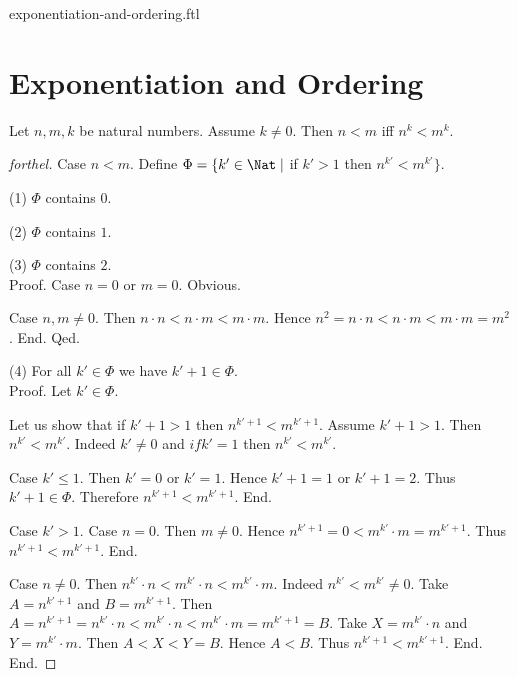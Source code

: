 \documentclass{naproche-library}
\begin{document}
\begin{smodule}{exponentiation-and-ordering.ftl}

  \section*{Exponentiation and Ordering}

  \begin{proposition}[forthel,id=ARITHMETIC_09_3373702288769024,printid]
    Let $n, m, k$ be natural numbers.
    Assume $k \neq 0$.
    Then $n < m$ iff $n^{k} < m^{k}$.
  \end{proposition}
  \begin{proof}[forthel]
    Case $n < m$.
      Define $\Phi = \{ k' \in \Nat \mid$ if $k' > 1$ then $n^{k'} < m^{k'} \}$.

      (1) $\Phi$ contains $0$.

      (2) $\Phi$ contains $1$.

      (3) $\Phi$ contains $2$. \\
      Proof.
        Case $n = 0$ or $m = 0$. Obvious.

        Case $n, m \neq 0$.
          Then $n \cdot n
            < n \cdot m
            < m \cdot m$.
          Hence $n^{2}
            = n \cdot n
            < n \cdot m
            < m \cdot m
            = m^{2}$.
        End.
      Qed.

      (4) For all $k' \in \Phi$ we have $k' + 1 \in \Phi$. \\
      Proof.
        Let $k' \in \Phi$.

        Let us show that if $k' + 1 > 1$ then $n^{k' + 1} < m^{k' + 1}$.
          Assume $k' + 1 > 1$.
          Then $n^{k'} < m^{k'}$.
          Indeed $k' \neq 0$ and $if k' = 1$ then $n^{k'} < m^{k'}$.

          Case $k' \leq 1$.
            Then $k' = 0$ or $k' = 1$.
            Hence $k' + 1 = 1$ or $k' + 1 = 2$.
            Thus $k' + 1 \in \Phi$.
            Therefore $n^{k' + 1} < m^{k' + 1}$.
          End.

          Case $k' > 1$.
            Case $n = 0$.
              Then $m \neq 0$.
              Hence $n^{k' + 1}
                = 0
                < m^{k'} \cdot m
                = m^{k' + 1}$.
              Thus $n^{k' + 1} < m^{k' + 1}$.
            End.

            Case $n \neq 0$.
              Then $n^{k'} \cdot n
                < m^{k'} \cdot n
                < m^{k'} \cdot m$.
              Indeed $n^{k'} < m^{k'} \neq 0$.
              Take $A = n^{k' + 1}$ and $B = m^{k' + 1}$. %
              Then $A
                = n^{k' + 1}
                = n^{k'} \cdot n
                < m^{k'} \cdot n
                < m^{k'} \cdot m
                = m^{k' + 1}
                = B$.
              Take $X = m^{k'} \cdot n$ and $Y = m^{k'} \cdot m$.
              Then $A < X < Y = B$.
              Hence $A < B$.
              Thus $n^{k' + 1} < m^{k' + 1}$.
            End.
          End.


\end{proof}
\end{smodule}
\end{document}
